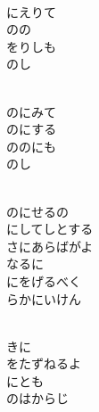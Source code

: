 \documentclass[10pt,b5j]{tarticle} %
\begin{document}
\vspace{1.5em} %
\newcommand{\linespace}{0.5em} %
\newcommand{\blocksize}{0.5\hsize} %
\newcommand{\itemmargin}{6em} %
\begin{enumerate} %
    \setlength{\itemindent}{\itemmargin} %
    \begin{minipage}[c]{\blocksize}
    
        \vspace{\linespace}
        \item~\\
        にえりて\\
        のの\\
        をりしも\\
        のし
        
        \vspace{\linespace}
        \item~\\
        のにみて\\
        のにする\\
        ののにも\\
        のし
        
        \vspace{\linespace}
        \item~\\
        のにせるの\\
        にしてしとする\\
        さにあらばがよ\\
        なるに\\
        にをげるべく\\
        らかにいけん
        
        \vspace{\linespace}
        \item~\\
        きに\\
        をたずねるよ\\
        にとも\\
        のはからじ
        

\end{minipage}
\end{enumerate}
\end{document}
